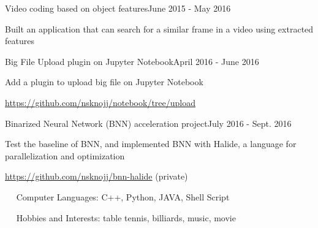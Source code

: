 \documentclass{joel_cv}
\begin{document}
\begin{sectionContentSimple}{Video coding based on object features}{June 2015 - May 2016}
\item Built an application that can search for a similar frame in a video using extracted features
\end{sectionContentSimple}

\begin{sectionContentSimple}{Big File Upload plugin on Jupyter Notebook}{April 2016 - June 2016}
\item Add a plugin to upload big file on Jupyter Notebook
\item \url{https://github.com/nsknojj/notebook/tree/upload}
\end{sectionContentSimple}

\begin{sectionContentSimple}{Binarized Neural Network (BNN) acceleration project}{July 2016 - Sept. 2016}
\item Test the baseline of BNN, and implemented BNN with Halide, a language for parallelization and optimization
\item \url{https://github.com/nsknojj/bnn-halide} (private)
\end{sectionContentSimple}


%
%

\begin{description}{}
	\item{\ \ } Computer Languages: C++, Python, JAVA, Shell Script
	\item{\ \ } Hobbies and Interests: table tennis, billiards, music, movie
\end{description}

%
%

\end{document}
